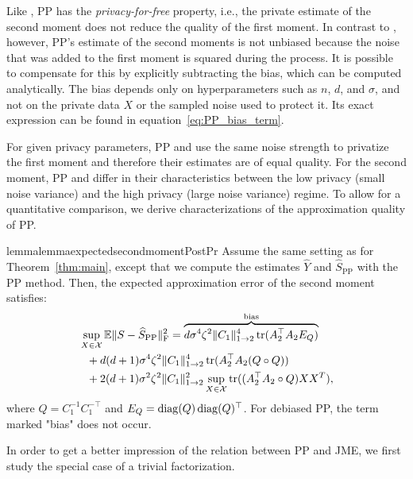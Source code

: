 Like \acronym, PP has the \emph{privacy-for-free} property, i.e., the private estimate of the second moment does not reduce the quality of the first moment. 
%
In contrast to \acronym, however, PP's estimate of the second moments is not unbiased because the noise that was added to the first moment is squared during the process. 
%
It is possible to compensate for this by explicitly subtracting the bias, which can be computed analytically. The bias depends only on hyperparameters such as $n$, $d$, and $\sigma$, and not on the private data $X$ or the sampled noise used to protect it. 
%
Its exact expression can be found in equation~\eqref{eq:PP_bias_term}.

For given privacy parameters, PP and \acronym use the same noise strength to
privatize the first moment and therefore their estimates are of equal quality.
%
For the second moment, PP and \acronym differ in their characteristics between 
the low privacy (small noise variance) and the high privacy (large noise variance) regime. 
%
To allow for a quantitative comparison, we derive characterizations of the 
approximation quality of PP. 

\begin{restatable}{lemma}{lemmaexpectedsecondmomentPostPr}\label{lem:PostPr_Moments}
%
Assume the same setting as for Theorem~\ref{thm:main}, except that 
we compute the estimates $\widehat{Y}$ and $\widehat{S}_{\text{PP}}$ with the PP method.
%
Then, the expected approximation error of the second moment satisfies:
%
\vspace{-\baselineskip}
\begin{align}
&\sup_{X \in \mathcal{X}}\mathbb{E}\|S - \widehat{S}_{\text{PP}}\|^2_{\text{F}}
=\overbrace{d\sigma^4 \zeta^2 \|C_1\|_{1 \to 2}^4 \operatorname{\operatorname{tr}}(A_2^\top A_2 E_Q)}^{\text{bias}}
\notag\\
&\ \ + d(d + 1)\sigma^4\zeta^2  \|C_1\|_{1 \to 2}^4 \operatorname{\operatorname{tr}}(A_2^\top A_2 (Q \circ Q)) \label{eq:PPquality}\\
&\ \ +2(d + 1)\sigma^2\zeta^2  \|C_1\|_{1 \to 2}^2 \sup_{X \in \mathcal{X}} \operatorname{\operatorname{tr}}((A_2^\top A_2 \circ Q)XX^T),\notag
\end{align}
%
where $Q = C_1^{-1} C_1^{-\top}$ and $E_Q = \operatorname{\operatorname{diag}}(Q)\operatorname{\operatorname{diag}}(Q)^{\top}$.
%
For debiased PP, the term marked "bias" does not occur.
\end{restatable}

In order to get a better impression of the relation between PP and JME, we first study the special case of a trivial factorization. %


